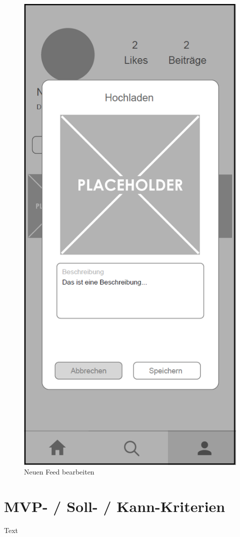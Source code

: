 \begin{figure}[H]
\begin{minipage}{.5\textwidth}
      \includegraphics[width=.8\linewidth]{images/PopUp_Edit_New_Photo_MockUp.png}
      \caption{Neuen Feed bearbeiten}
      \label{fig:edit_new_feed}
    \end{minipage}
\end{figure}

\section{MVP- / Soll- / Kann-Kriterien\label{sec2.2:Unterpunkt-2}}

Text